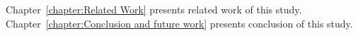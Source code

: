 Chapter~\ref{chapter:Related Work} presents related work of this study.
%
Chapter~\ref{chapter:Conclusion and future work} presents conclusion of this study.



